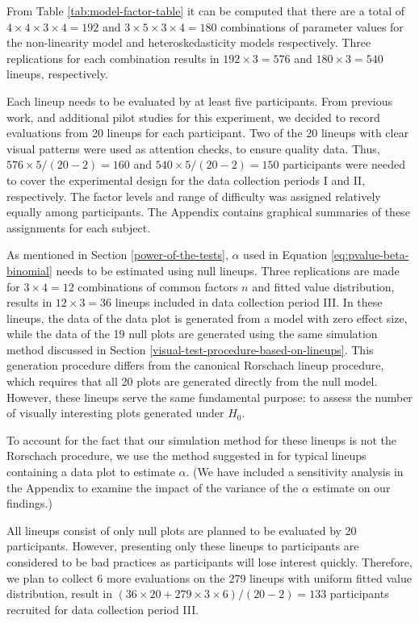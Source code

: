 \documentclass[]{interact}
\theoremstyle{plain}%
\theoremstyle{definition}
\theoremstyle{remark}
\begin{document}
From Table \ref{tab:model-factor-table} it can be computed that there
are a total of \(4 \times 4 \times 3 \times 4 = 192\) and
\(3 \times 5 \times 3 \times 4 = 180\) combinations of parameter values
for the non-linearity model and heteroskedasticity models respectively.
Three replications for each combination results in
\(192 \times 3 = 576\) and \(180 \times 3 = 540\) lineups, respectively.

Each lineup needs to be evaluated by at least five participants. From
previous work, and additional pilot studies for this experiment, we
decided to record evaluations from 20 lineups for each participant. Two
of the 20 lineups with clear visual patterns were used as attention
checks, to ensure quality data. Thus, \(576 \times 5 / (20-2) = 160\)
and \(540 \times 5 / (20-2) = 150\) participants were needed to cover
the experimental design for the data collection periods I and II,
respectively. The factor levels and range of difficulty was assigned
relatively equally among participants. The Appendix contains graphical
summaries of these assignments for each subject.

As mentioned in Section \ref{power-of-the-tests}, \(\alpha\) used in
Equation \ref{eq:pvalue-beta-binomial} needs to be estimated using null
lineups. Three replications are made for \(3 \times 4 = 12\)
combinations of common factors \(n\) and fitted value distribution,
results in \(12 \times 3 = 36\) lineups included in data collection
period III. In these lineups, the data of the data plot is generated
from a model with zero effect size, while the data of the 19 null plots
are generated using the same simulation method discussed in Section
\ref{visual-test-procedure-based-on-lineups}. This generation procedure
differs from the canonical Rorschach lineup procedure, which requires
that all 20 plots are generated directly from the null model. However,
these lineups serve the same fundamental purpose: to assess the number
of visually interesting plots generated under \(H_0\).

To account for the fact that our simulation method for these lineups is
not the Rorschach procedure, we use the method suggested in
\citet{vanderplas2021statistical} for typical lineups containing a data
plot to estimate \(\alpha\). (We have included a sensitivity analysis in
the Appendix to examine the impact of the variance of the \(\alpha\)
estimate on our findings.)

All lineups consist of only null plots are planned to be evaluated by 20
participants. However, presenting only these lineups to participants are
considered to be bad practices as participants will lose interest
quickly. Therefore, we plan to collect 6 more evaluations on the 279
lineups with uniform fitted value distribution, result in
\((36 \times 20 + 279 \times 3 \times 6) / (20-2) = 133\) participants
recruited for data collection period III.
\end{document}
